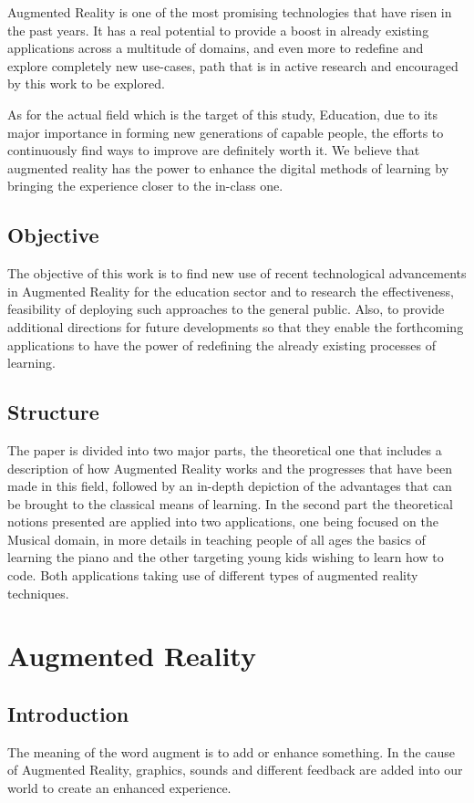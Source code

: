 \documentclass[12 pct]{report}
\begin{document}
Augmented Reality is one of the most promising technologies that have risen in the past years. It has a real potential to provide a boost in already existing applications across a multitude of domains, and even more to redefine and explore completely new use-cases, path that is in active research and encouraged
 by this work to be explored.

As for the actual field which is the target of this study, Education, due to its major importance in forming new generations of capable people, the efforts to continuously find ways to improve are definitely worth it. We believe that augmented reality has the power to enhance the digital methods of learning by  bringing the experience closer  to the in-class one.
\section{Objective}
The objective of this work is to find new use of recent technological advancements in Augmented Reality for the education sector and to research the effectiveness, feasibility of deploying such approaches to the general public. Also, to provide additional directions for future developments so that they enable the  forthcoming applications to have the power of redefining the already existing processes of learning.

\section{Structure}
The paper is divided into two major parts, the theoretical one that includes a description of how Augmented Reality works and the progresses that have been made in this field, followed by an in-depth depiction of the advantages that can be brought to the classical means of learning. In the second part the theoretical notions presented are applied into two applications, one being focused on the Musical domain, in more details in teaching people of all ages the basics of learning the piano and the other targeting young kids wishing to learn how to code. Both applications taking use of different types of augmented reality techniques.
\chapter{Augmented Reality}

\section{Introduction}
The meaning of the word augment is to add or enhance something. In the cause of Augmented Reality, graphics, sounds and different feedback are added into our world to create an enhanced experience.
\end{document}
